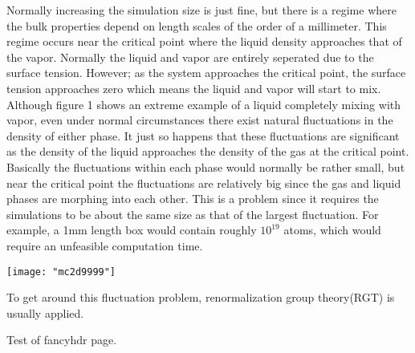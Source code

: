 Normally increasing the simulation size is just fine, but there is a regime where the bulk properties depend on length scales of the order of a millimeter. This regime occurs near the critical point where the liquid density approaches that of the vapor. Normally the liquid and vapor are entirely seperated due to the surface tension. However; as the system approaches the critical point, the surface tension approaches zero which means the liquid and vapor will start to mix. Although figure 1 shows an extreme example of a liquid completely mixing with vapor, even under normal circumstances there exist natural fluctuations in the density of either phase. It just so happens that these fluctuations are significant as the density of the liquid approaches the density of the gas at the critical point. Basically the fluctuations within each phase would normally be rather small, but near the critical point the fluctuations are relatively big since the gas and liquid phases are morphing into each other. This is a problem since it requires the simulations to be about the same size as that of the largest fluctuation. For example, a 1mm length box would contain roughly $10^{19}$ atoms, which would require an unfeasible computation time.

\texttt{[image: "mc2d9999"]}

To get around this fluctuation problem, renormalization group theory(RGT) is usually applied. 



\newpage

Test of fancyhdr page.
